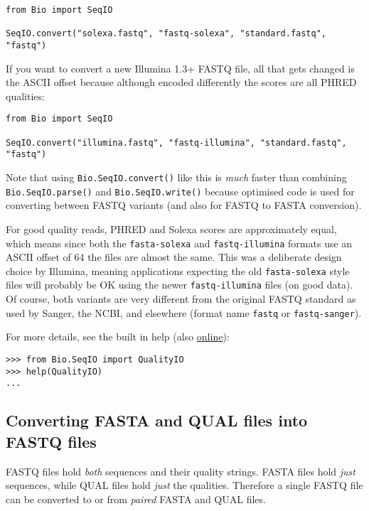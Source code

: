 \begin{verbatim}
from Bio import SeqIO

SeqIO.convert("solexa.fastq", "fastq-solexa", "standard.fastq", "fastq")
\end{verbatim}

If you want to convert a new Illumina 1.3+ FASTQ file, all that gets changed
is the ASCII offset because although encoded differently the scores are all
PHRED qualities:

\begin{verbatim}
from Bio import SeqIO

SeqIO.convert("illumina.fastq", "fastq-illumina", "standard.fastq", "fastq")
\end{verbatim}

Note that using \verb|Bio.SeqIO.convert()| like this is \emph{much} faster
than combining \verb|Bio.SeqIO.parse()| and \verb|Bio.SeqIO.write()|
because optimised code is used for converting between FASTQ variants
(and also for FASTQ to FASTA conversion).

For good quality reads, PHRED and Solexa scores are approximately equal,
which means since both the \texttt{fasta-solexa} and \texttt{fastq-illumina}
formats use an ASCII offset of 64 the files are almost the same. This was a
deliberate design choice by Illumina, meaning applications expecting the old
\texttt{fasta-solexa} style files will probably be OK using the newer
\texttt{fastq-illumina} files (on good data). Of course, both variants are
very different from the original FASTQ standard as used by Sanger,
the NCBI, and elsewhere (format name \texttt{fastq} or \texttt{fastq-sanger}).

For more details, see the built in help (also \href{http://www.biopython.org/docs/1.77/api/Bio.SeqIO.QualityIO.html}{online}):

\begin{verbatim}
>>> from Bio.SeqIO import QualityIO
>>> help(QualityIO)
...
\end{verbatim}

\subsection{Converting FASTA and QUAL files into FASTQ files}
\label{sec:SeqIO-fasta-qual-conversion}

FASTQ files hold \emph{both} sequences and their quality strings.
FASTA files hold \emph{just} sequences, while QUAL files hold \emph{just}
the qualities. Therefore a single FASTQ file can be converted to or from
\emph{paired} FASTA and QUAL files.


